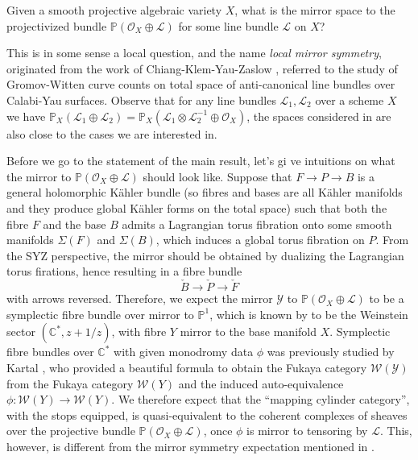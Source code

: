 \begin{ques}\label{Q:mirror-projective-bundle}
    Given a smooth projective algebraic variety $X$, what is the mirror space to the projectivized bundle $\mathbb{P} (\mathcal{O}_X\oplus\mathcal{L})$ for some line bundle $\mathcal{L}$ on $X$?
\end{ques}
This is in some sense a local question, and the name \emph{local mirror symmetry}, originated from the work of Chiang-Klem-Yau-Zaslow \cite{CKYZ99}, referred to the study of Gromov-Witten curve counts on total space of anti-canonical line bundles over Calabi-Yau surfaces. Observe that for any line bundles $\mathcal{L}_1,\mathcal{L}_2$ over a scheme $X$ we have $\mathbb{P}_X (\mathcal{L}_1\oplus\mathcal{L}_2)=\mathbb{P}_X (\mathcal{L}_1\otimes\mathcal{L}_2^{-1}\oplus\mathcal{O}_X)$, the spaces considered in \cite{CKYZ99} are also close to the cases we are interested in.\par
Before we go to the statement of the main result, let's gi ve intuitions on what the mirror to $\mathbb{P} (\mathcal{O}_X\oplus\mathcal{L})$ should look like. Suppose that $F\to P\to B$ is a general holomorphic Kähler bundle (so fibres and bases are all Kähler manifolds and they produce global Kähler forms on the total space) such that both the fibre $F$ and the base $B$ admits a Lagrangian torus fibration onto some smooth manifolds $\Sigma (F)$ and $\Sigma (B)$, which induces a global torus fibration on $P$. From the SYZ perspective, the mirror should be obtained by dualizing the Lagrangian torus firations, hence resulting in a fibre bundle \[
    \check{B}\to\check{P}\to\check{F}
\]with arrows reversed. Therefore, we expect the mirror $\mathcal{Y}$ to $\mathbb{P} (\mathcal{O}_X\oplus\mathcal{L})$ to be a symplectic fibre bundle over mirror to $\mathbb{P}^1$, which is known by \cite{FLTZ12} to be the Weinstein sector $(\mathbb{C}^{\ast}, z+1/z)$, with fibre $Y$ mirror to the base manifold $X$. Symplectic fibre bundles over $\mathbb{C}^{\ast}$ with given monodromy data $\phi$ was previously studied by Kartal \cite{Kartal21}, who provided a beautiful formula to obtain the Fukaya category $\mathcal{W} (\mathcal{Y})$ from the Fukaya category $\mathcal{W} (Y)$ and the induced auto-equivalence $\phi\colon\mathcal{W} (Y)\to\mathcal{W} (Y)$. We therefore expect that the ``mapping cylinder category'', with the stops equipped, is quasi-equivalent to the coherent complexes of sheaves over the projective bundle $\mathbb{P}\left(\mathcal{O}_X\oplus\mathcal{L}\right)$, once $\phi$ is mirror to tensoring by $\mathcal{L}$. This, however, is different from the mirror symmetry expectation mentioned in \cite{Kartal21}.
